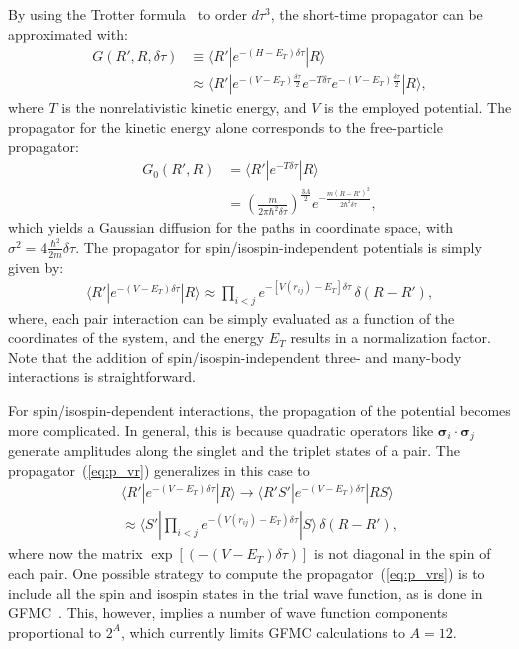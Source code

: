 \documentclass[aps,prc,twocolumn,superscriptaddress,floatfix]{revtex4-1}
\begin{document}
By using the Trotter formula~\cite{Trotter:1959} to order $d\tau^3$,
the short-time propagator can be approximated with:
\begin{align}
G(R',R,\delta\tau)&\equiv\langle R'|e^{-(H-E_T)\delta\tau}|R\rangle \nonumber \\
&\approx \langle R'|e^{-(V-E_T)\frac{\delta\tau}{2}}e^{-T\delta\tau}e^{-(V-E_T)\frac{\delta\tau}{2}}
|R\rangle ,
\end{align}
where $T$ is the nonrelativistic kinetic energy, and $V$ is the employed potential.
The propagator for the kinetic energy alone corresponds to the free-particle propagator:
\begin{align} 
G_0(R',R)&=\langle R'|e^{-T\delta\tau}|R\rangle\nonumber \\
&=\left(\frac{m}{2\pi\hbar^2\delta\tau}\right)^{\frac{3A}{2}}e^{-\frac{m(R-R')^2}{2\hbar^2\delta\tau}} ,
\label{eq:g0}
\end{align}
which yields a Gaussian diffusion for the paths in coordinate space, with
$\sigma^2 = 4 \frac{\hbar^2}{2m} \delta\tau$.
The propagator for spin/isospin-independent potentials is simply given by: 
\begin{align}
\langle R'|e^{-(V-E_T)\delta\tau}|R\rangle \approx
\prod_{i<j}e^{-[V(r_{ij})-E_T]\delta\tau}\,\delta(R-R') ,
\label{eq:p_vr}
\end{align}
where, each pair interaction can be simply evaluated as a function of the coordinates of the 
system, and the energy $E_T$ results in a normalization factor. 
Note that the addition of spin/isospin-independent three- and many-body interactions
is straightforward.

For spin/isospin-dependent interactions, the propagation of the potential becomes more complicated.
In general, this is because quadratic operators like $\bm\sigma_i\cdot\bm\sigma_j$
generate amplitudes along the singlet and the triplet states of a pair. 
The propagator~(\ref{eq:p_vr}) generalizes in this case to
\begin{align}
\langle R'|e^{-(V-E_T)\delta\tau}|R\rangle  \rightarrow
\langle R'S'|e^{-(V-E_T)\delta\tau}|RS\rangle \nonumber \\
 \approx \langle S'|\prod_{i<j}e^{-(V(r_{ij})-E_T)\delta\tau}|S\rangle\,\delta(R-R') ,
\label{eq:p_vrs}
\end{align}
where now the matrix $\exp[(-(V-E_T)\delta\tau)]$ is not diagonal in the spin of each pair.
One possible strategy to compute the propagator~(\ref{eq:p_vrs}) is to include all the  
spin and isospin states in the trial wave function, as is done in GFMC~\cite{Carlson:2015}.  
This, however, implies a number of wave function components proportional to $2^A$, 
which currently limits GFMC calculations to $A=12$.
\end{document}
